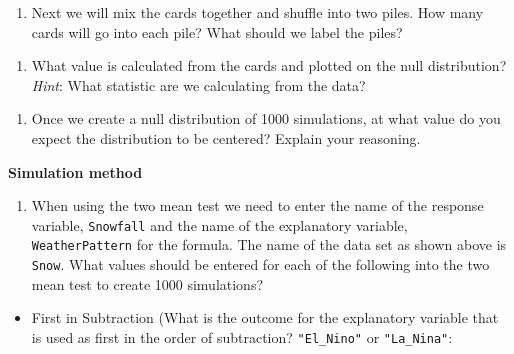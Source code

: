 \documentclass[
]{report}
\providecommand{\tightlist}{%
  \setlength{\itemsep}{0pt}\setlength{\parskip}{0pt}}
\begin{document}
\vspace{0.5in}

\begin{enumerate}
\def\labelenumi{\arabic{enumi}.}
\setcounter{enumi}{11}
\tightlist
\item
  Next we will mix the cards together and shuffle into two piles. How many cards will go into each pile? What should we label the piles?
\end{enumerate}

\vspace{1in}

\begin{enumerate}
\def\labelenumi{\arabic{enumi}.}
\setcounter{enumi}{12}
\tightlist
\item
  What value is calculated from the cards and plotted on the null distribution? \emph{Hint}: What statistic are we calculating from the data?
\end{enumerate}

\vspace{0.3in}

\begin{enumerate}
\def\labelenumi{\arabic{enumi}.}
\setcounter{enumi}{13}
\tightlist
\item
  Once we create a null distribution of 1000 simulations, at what value do you expect the distribution to be centered? Explain your reasoning.
\end{enumerate}

\vspace{.8in}

\textbf{Simulation method}

\begin{enumerate}
\def\labelenumi{\arabic{enumi}.}
\setcounter{enumi}{14}
\tightlist
\item
  When using the two mean test we need to enter the name of the response variable, \texttt{Snowfall} and the name of the explanatory variable, \texttt{WeatherPattern} for the formula. The name of the data set as shown above is \texttt{Snow}. What values should be entered for each of the following into the two mean test to create 1000 simulations?
\end{enumerate}

\vspace{.2in}

\begin{itemize}
\tightlist
\item
  First in Subtraction (What is the outcome for the explanatory variable that is used as first in the order of subtraction? \texttt{"El\_Nino"} or \texttt{"La\_Nina"}:
\end{itemize}
\end{document}
